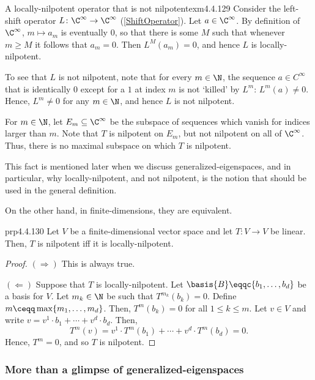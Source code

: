 \begin{exm}{A locally-nilpotent operator that is not nilpotent}{exm4.4.129}
	Consider the left-shift operator $L\colon \C ^{\infty}\rightarrow \C ^{\infty}$ (\cref{ShiftOperator}).  Let $a\in \C ^{\infty}$.  By definition of $\C ^{\infty}$, $m\mapsto a_m$ is eventually $0$, so that there is some $M$ such that whenever $m\geq M$ it follows that $a_m=0$.  Then $L^M(a_m)=0$, and hence $L$ is locally-nilpotent.
	
	To see that $L$ is not nilpotent, note that for every $m\in \N$, the sequence $a\in C^{\infty}$ that is identically $0$ except for a $1$ at index $m$ is not `killed' by $L^m$:  $L^m(a)\neq 0$.  Hence, $L^m\neq 0$ for any $m\in \N$, and hence $L$ is not nilpotent.
	
	\horizontalrule
	
	For $m\in \N$, let $E_m\subseteq \C ^{\infty}$ be the subspace of sequences which vanish for indices larger than $m$.  Note that $T$ is nilpotent on $E_m$, but not nilpotent on all of $\C ^{\infty}$.  Thus, there is no maximal subspace on which $T$ is nilpotent.
	\begin{rmk}
		This fact is mentioned later when we discuss generalized-eigenspaces, and in particular, why locally-nilpotent, and not nilpotent, is the notion that should be used in the general definition.
	\end{rmk}
\end{exm}
On the other hand, in finite-dimensions, they are equivalent.
\begin{prp}{}{prp4.4.130}
	Let $V$ be a finite-dimensional vector space and let $T\colon V\rightarrow V$ be linear.  Then, $T$ is nilpotent iff it is locally-nilpotent.
	\begin{proof}
		$(\Rightarrow )$ This is always true.
		
		\blni
		$(\Leftarrow )$ Suppose that $T$ is locally-nilpotent.  Let $\basis{B}\eqqc \{ b_1,\ldots ,b_d\}$ be a basis for $V$.  Let $m_k\in \N$ be such that $T^{m_k}(b_k)=0$.  Define $m\ceqq \max \{ m_1,\ldots ,m_d\}$.  Then, $T^m(b_k)=0$ for all $1\leq k\leq m$.  Let $v\in V$ and write $v=v^1\cdot b_1+\cdots +v^d\cdot b_d$.  Then,
		\begin{equation}
			T^m(v)=v^1\cdot T^m(b_1)+\cdots +v^d\cdot T^m(b_d)=0.
		\end{equation}
		Hence, $T^m=0$, and so $T$ is nilpotent.
	\end{proof}
\end{prp}

\subsubsection{More than a glimpse of generalized-eigenspaces}

